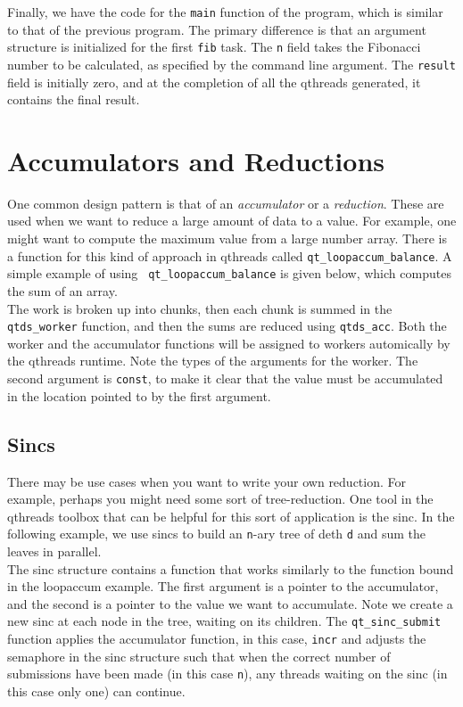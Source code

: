 \documentclass[12pt]{article}
\begin{document}
Finally, we have the code for the {\tt main} function of the program, which is similar to that of the previous program.  The primary difference is that an argument structure is initialized for the first {\tt fib} task.  The {\tt n} field takes the Fibonacci number to be calculated, as specified by the command line argument.  The {\tt result} field is initially zero, and at the completion of all the qthreads generated, it contains the final result.

\section{Accumulators and Reductions}
One common design pattern is that of an \emph{accumulator} or a
\emph{reduction}. These are used when we want to reduce a large amount of data
to a value. For example, one might want to compute the maximum value from a
large number array. There is a function for this kind of approach in qthreads
called {\tt qt\_loopaccum\_balance}. A simple example of using {\tt
qt\_loopaccum\_balance} is given below, which computes the sum of an array.
\\



The work is broken up into chunks, then each chunk is summed in the {\tt
qtds\_worker} function, and then the sums are reduced using {\tt qtds\_acc}.
Both the worker and the accumulator functions will be assigned to workers
automically by the qthreads runtime. Note the types of the arguments for the
worker. The second argument is {\tt const}, to make it clear that the value must
be accumulated in the location pointed to by the first argument. 

\subsection{Sincs}
There may be use cases when you want to write your own reduction. For example,
perhaps you might need some sort of tree-reduction. One tool in the qthreads
toolbox that can be helpful for this sort of application is the sinc. In the
following example, we use sincs to build an {\tt n}-ary tree of deth {\tt d}
and sum the leaves in parallel.
\\



The sinc structure contains a function that works similarly to the function
bound in the loopaccum example. The first argument is a pointer to the
accumulator, and the second is a pointer to the value we want to accumulate.
Note we create a new sinc at each node in the tree, waiting on its children. The
{\tt qt\_sinc\_submit} function applies the accumulator function, in this case,
{\tt incr} and adjusts the semaphore in the sinc structure such that when the
correct number of submissions have been made (in this case {\tt n}), any threads
waiting on the sinc (in this case only one) can continue.
\end{document}

